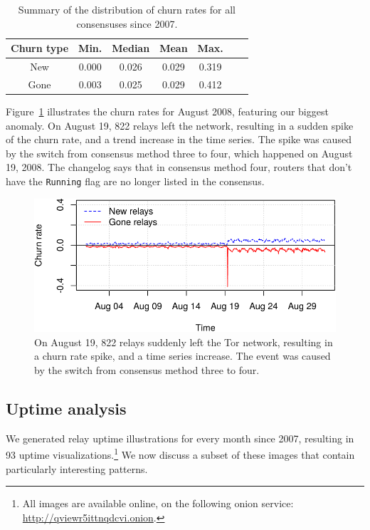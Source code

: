 \begin{table}[t]
	\centering
	\begin{tabular}{ccccccc}
	\textbf{Churn type} & \textbf{Min.} & \textbf{Median} & \textbf{Mean} & \textbf{Max.} \\
	\hline
	New & 0.000 & 0.026 & 0.029 & 0.319 \\
	Gone & 0.003 & 0.025 & 0.029 & 0.412 \\
	\end{tabular}
	\caption{Summary of the distribution of churn rates for all consensuses
	since 2007.}
	\label{tab:churn-dist}
\end{table}

Figure~\ref{fig:2008-08} illustrates the churn rates for August 2008, featuring
our biggest anomaly.  On August 19, 822 relays left the network, resulting in a
sudden spike of the churn rate, and a trend increase in the time series.  The
spike was caused by the switch from consensus method three to four, which
happened on August 19, 2008.  The changelog says that in consensus method four,
routers that don't have the \texttt{Running} flag are no longer listed in the
consensus.

\begin{figure}[t]
	\centering
	\includegraphics[width=\linewidth]{diagrams/2008-08.pdf}
	\caption{On August 19, 822 relays suddenly left the Tor network, resulting
	in a churn rate spike, and a time series increase.  The event was caused by
	the switch from consensus method three to four.}
	\label{fig:2008-08}
\end{figure}


\subsection{Uptime analysis}
\label{sec:uptime}
We generated relay uptime illustrations for every month since 2007, resulting in
93 uptime visualizations.\footnote{All images are available online, on the following
onion service: \url{http://qviewr5ittnqdcvi.onion}.}
We now discuss a subset of these images that
contain particularly interesting patterns.

